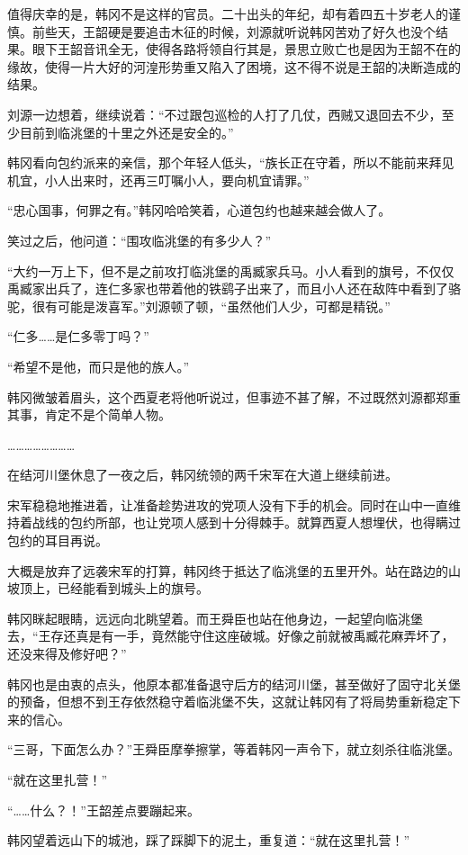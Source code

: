 值得庆幸的是，韩冈不是这样的官员。二十出头的年纪，却有着四五十岁老人的谨慎。前些天，王韶硬是要追击木征的时候，刘源就听说韩冈苦劝了好久也没个结果。眼下王韶音讯全无，使得各路将领自行其是，景思立败亡也是因为王韶不在的缘故，使得一片大好的河湟形势重又陷入了困境，这不得不说是王韶的决断造成的结果。

刘源一边想着，继续说着：“不过跟包巡检的人打了几仗，西贼又退回去不少，至少目前到临洮堡的十里之外还是安全的。”

韩冈看向包约派来的亲信，那个年轻人低头，“族长正在守着，所以不能前来拜见机宜，小人出来时，还再三叮嘱小人，要向机宜请罪。”

“忠心国事，何罪之有。”韩冈哈哈笑着，心道包约也越来越会做人了。

笑过之后，他问道：“围攻临洮堡的有多少人？”

“大约一万上下，但不是之前攻打临洮堡的禹臧家兵马。小人看到的旗号，不仅仅禹臧家出兵了，连仁多家也带着他的铁鹞子出来了，而且小人还在敌阵中看到了骆驼，很有可能是泼喜军。”刘源顿了顿，“虽然他们人少，可都是精锐。”

“仁多……是仁多零丁吗？”

“希望不是他，而只是他的族人。”

韩冈微皱着眉头，这个西夏老将他听说过，但事迹不甚了解，不过既然刘源都郑重其事，肯定不是个简单人物。

……………………

在结河川堡休息了一夜之后，韩冈统领的两千宋军在大道上继续前进。

宋军稳稳地推进着，让准备趁势进攻的党项人没有下手的机会。同时在山中一直维持着战线的包约所部，也让党项人感到十分得棘手。就算西夏人想埋伏，也得瞒过包约的耳目再说。

大概是放弃了远袭宋军的打算，韩冈终于抵达了临洮堡的五里开外。站在路边的山坡顶上，已经能看到城头上的旗号。

韩冈眯起眼睛，远远向北眺望着。而王舜臣也站在他身边，一起望向临洮堡去，“王存还真是有一手，竟然能守住这座破城。好像之前就被禹臧花麻弄坏了，还没来得及修好吧？”

韩冈也是由衷的点头，他原本都准备退守后方的结河川堡，甚至做好了固守北关堡的预备，但想不到王存依然稳守着临洮堡不失，这就让韩冈有了将局势重新稳定下来的信心。

“三哥，下面怎么办？”王舜臣摩拳擦掌，等着韩冈一声令下，就立刻杀往临洮堡。

“就在这里扎营！”

“……什么？！”王韶差点要蹦起来。

韩冈望着远山下的城池，踩了踩脚下的泥土，重复道：“就在这里扎营！”

